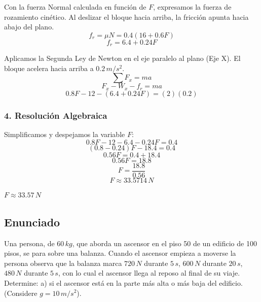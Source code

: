 \documentclass[12pt, a4paper]{article}
\begin{document}
Con la fuerza Normal calculada en función de $F$, expresamos la fuerza de rozamiento cinético. Al deslizar el bloque hacia arriba, la fricción apunta hacia abajo del plano.
$$ f_r = \mu N = 0.4 (16 + 0.6 F) $$
$$ f_r = 6.4 + 0.24 F $$

Aplicamos la Segunda Ley de Newton en el eje paralelo al plano (Eje X). El bloque acelera hacia arriba a $0.2 \, \si{m/s^2}$.
$$ \sum F_x = m a $$
$$ F_x - W_x - f_r = m a $$
$$ 0.8 F - 12 - (6.4 + 0.24 F) = (2)(0.2) $$

\subsubsection*{4. Resolución Algebraica}
Simplificamos y despejamos la variable $F$:
$$ 0.8 F - 12 - 6.4 - 0.24 F = 0.4 $$
$$ (0.8 - 0.24) F - 18.4 = 0.4 $$
$$ 0.56 F = 0.4 + 18.4 $$
$$ 0.56 F = 18.8 $$
$$ F = \frac{18.8}{0.56} $$
$$ F \approx 33.5714 \, \si{N} $$

\begin{tcolorbox}[colback=green!5!white, colframe=green!50!black, title=Respuesta Final]
\centering \Large $F \approx 33.57 \, \si{N}$
\end{tcolorbox}

\newpage

\subsection*{Enunciado}
Una persona, de $60 \, \si{kg}$, que aborda un ascensor en el piso 50 de un edificio de 100 pisos, se para sobre una balanza. Cuando el ascensor empieza a moverse la persona observa que la balanza marca $720 \, \si{N}$ durante $5 \, \si{s}$, $600 \, \si{N}$ durante $20 \, \si{s}$, $480 \, \si{N}$ durante $5 \, \si{s}$, con lo cual el ascensor llega al reposo al final de su viaje. Determine:
a) si el ascensor está en la parte más alta o más baja del edificio. (Considere $g = 10 \, \si{m/s^2}$).

\begin{center}
\end{center}
\end{document}
